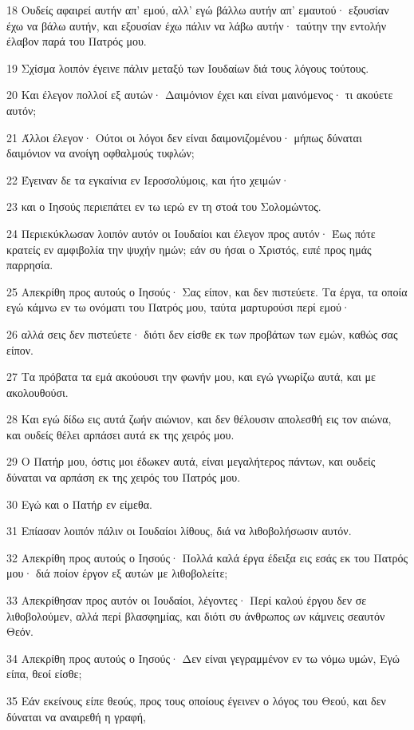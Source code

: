 \par 18 Ουδείς αφαιρεί αυτήν απ' εμού, αλλ' εγώ βάλλω αυτήν απ' εμαυτού· εξουσίαν έχω να βάλω αυτήν, και εξουσίαν έχω πάλιν να λάβω αυτήν· ταύτην την εντολήν έλαβον παρά του Πατρός μου.
\par 19 Σχίσμα λοιπόν έγεινε πάλιν μεταξύ των Ιουδαίων διά τους λόγους τούτους.
\par 20 Και έλεγον πολλοί εξ αυτών· Δαιμόνιον έχει και είναι μαινόμενος· τι ακούετε αυτόν;
\par 21 Άλλοι έλεγον· Ούτοι οι λόγοι δεν είναι δαιμονιζομένου· μήπως δύναται δαιμόνιον να ανοίγη οφθαλμούς τυφλών;
\par 22 Έγειναν δε τα εγκαίνια εν Ιεροσολύμοις, και ήτο χειμών·
\par 23 και ο Ιησούς περιεπάτει εν τω ιερώ εν τη στοά του Σολομώντος.
\par 24 Περιεκύκλωσαν λοιπόν αυτόν οι Ιουδαίοι και έλεγον προς αυτόν· Έως πότε κρατείς εν αμφιβολία την ψυχήν ημών; εάν συ ήσαι ο Χριστός, ειπέ προς ημάς παρρησία.
\par 25 Απεκρίθη προς αυτούς ο Ιησούς· Σας είπον, και δεν πιστεύετε. Τα έργα, τα οποία εγώ κάμνω εν τω ονόματι του Πατρός μου, ταύτα μαρτυρούσι περί εμού·
\par 26 αλλά σεις δεν πιστεύετε· διότι δεν είσθε εκ των προβάτων των εμών, καθώς σας είπον.
\par 27 Τα πρόβατα τα εμά ακούουσι την φωνήν μου, και εγώ γνωρίζω αυτά, και με ακολουθούσι.
\par 28 Και εγώ δίδω εις αυτά ζωήν αιώνιον, και δεν θέλουσιν απολεσθή εις τον αιώνα, και ουδείς θέλει αρπάσει αυτά εκ της χειρός μου.
\par 29 Ο Πατήρ μου, όστις μοι έδωκεν αυτά, είναι μεγαλήτερος πάντων, και ουδείς δύναται να αρπάση εκ της χειρός του Πατρός μου.
\par 30 Εγώ και ο Πατήρ εν είμεθα.
\par 31 Επίασαν λοιπόν πάλιν οι Ιουδαίοι λίθους, διά να λιθοβολήσωσιν αυτόν.
\par 32 Απεκρίθη προς αυτούς ο Ιησούς· Πολλά καλά έργα έδειξα εις εσάς εκ του Πατρός μου· διά ποίον έργον εξ αυτών με λιθοβολείτε;
\par 33 Απεκρίθησαν προς αυτόν οι Ιουδαίοι, λέγοντες· Περί καλού έργου δεν σε λιθοβολούμεν, αλλά περί βλασφημίας, και διότι συ άνθρωπος ων κάμνεις σεαυτόν Θεόν.
\par 34 Απεκρίθη προς αυτούς ο Ιησούς· Δεν είναι γεγραμμένον εν τω νόμω υμών, Εγώ είπα, θεοί είσθε;
\par 35 Εάν εκείνους είπε θεούς, προς τους οποίους έγεινεν ο λόγος του Θεού, και δεν δύναται να αναιρεθή η γραφή,
